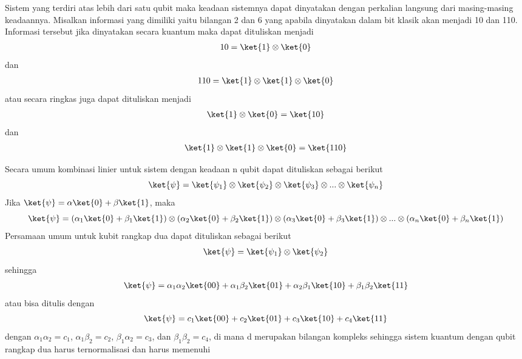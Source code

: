 \par
Sistem yang terdiri atas lebih dari satu qubit maka keadaan sistemnya dapat dinyatakan dengan perkalian langsung dari masing-masing keadaannya. Misalkan informasi yang dimiliki yaitu bilangan 2 dan 6 yang apabila dinyatakan dalam bit klasik akan menjadi 10 dan 110. Informasi tersebut jika dinyatakan secara kuantum maka dapat dituliskan menjadi
\begin{align*}
10 = \ket{1} \otimes \ket{0}
\end{align*}
dan
\begin{align*}
110 = \ket{1} \otimes \ket{1} \otimes \ket{0}
\end{align*}
atau secara ringkas juga dapat dituliskan menjadi
\begin{align*}
\ket{1} \otimes \ket{0} = \ket{10}
\end{align*}
dan
\begin{align*}
\ket{1} \otimes \ket{1} \otimes \ket{0} = \ket{110}
\end{align*}
\par
Secara umum kombinasi linier untuk sistem dengan keadaan n qubit dapat dituliskan sebagai berikut
\begin{equation}
    \ket{\psi} = \ket{\psi_1}\otimes\ket{\psi_2}\otimes\ket{\psi_3}\otimes...\otimes\ket{\psi_n}
\end{equation}
Jika $\ket{\psi} = \alpha \ket{0} + \beta \ket{1}$, maka
\begin{equation}
    \ket{\psi} = (\alpha_1 \ket{0} + \beta_1 \ket{1})\otimes(\alpha_2 \ket{0} + \beta_2 \ket{1})\otimes(\alpha_3 \ket{0} + \beta_3 \ket{1})\otimes...\otimes(\alpha_n \ket{0} + \beta_n \ket{1})
\end{equation}
Persamaan umum untuk kubit rangkap dua dapat dituliskan sebagai berikut
\begin{align*}
    \ket{\psi} = \ket{\psi_1}\otimes\ket{\psi_2}
\end{align*}
sehingga
\begin{align*}
    \ket{\psi} = \alpha_1\alpha_2\ket{00} + \alpha_1\beta_2\ket{01} + \alpha_2\beta_1\ket{10} + \beta_1\beta_2\ket{11}
\end{align*}
atau bisa ditulis dengan
\begin{equation}
    \ket{\psi} = c_1\ket{00} + c_2\ket{01} + c_3\ket{10} + c_4\ket{11}
\end{equation}
dengan $\alpha_1\alpha_2=c_1$, $\alpha_1\beta_2=c_2$, $\beta_1\alpha_2=c_3$, dan $\beta_1\beta_2=c_4$, di mana d merupakan bilangan kompleks sehingga sistem kuantum dengan qubit rangkap dua harus ternormalisasi dan harus memenuhi
